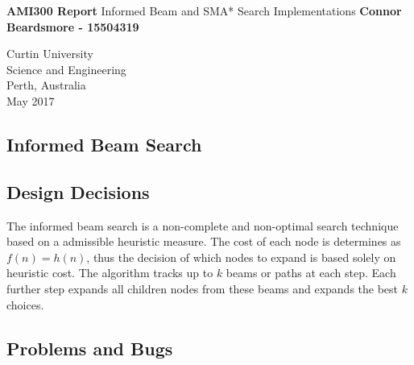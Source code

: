 \documentclass[]{article}
\begin{document}


	

\begin{titlepage}
	\begin{center}
		\vspace*{1cm}
		\LARGE\textbf{AMI300 Report} \vspace{0.5cm}
		\break
	    Informed Beam and SMA* Search Implementations
		\vspace{1cm}
		\break
		\Large\textbf{Connor Beardsmore - 15504319} 
		\vspace{15cm}

		\normalsize
		Curtin University \\
		Science and Engineering \\
		Perth, Australia \\
	    May 2017
	    
	\end{center}
\end{titlepage}


\vspace*{-0.8cm}
\begin{center}
	\section*{Informed Beam Search}
\end{center}

\vspace*{0.8cm}
\subsection*{Design Decisions}

The informed beam search is a non-complete and non-optimal search technique based on a admissible heuristic measure. The cost of each node is determines as $f(n)=h(n)$, thus the decision of which nodes to expand is based solely on heuristic cost. The algorithm tracks up to $k$ beams or paths at each step. Each further step expands all children nodes from these beams and expands the best $k$ choices.

\subsection*{Problems and Bugs}
\end{document}
